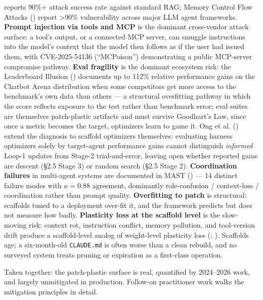 \documentclass[
]{article}
\begin{document}
reports 90\%+ attack success rate against standard RAG; Memory Control
Flow Attacks () report
\textgreater90\% vulnerability across major LLM agent frameworks.
\textbf{Prompt injection via tools and MCP} is the dominant cross-vendor
attack surface: a tool's output, or a connected MCP server, can smuggle
instructions into the model's context that the model then follows as if
the user had issued them, with CVE-2025-54136 (``MCPoison'')
demonstrating a public MCP-server compromise pathway. \textbf{Eval
fragility} is the dominant ecosystem risk: the Leaderboard Illusion
() documents up
to 112\% relative performance gains on the Chatbot Arena distribution
when some competitors get more access to the benchmark's own data than
others --- a structural overfitting pathway in which the score reflects
exposure to the test rather than benchmark error; eval suites are
themselves patch-plastic artifacts and must survive Goodhart's Law,
since once a metric becomes the target, optimizers learn to game it. Ong
et al. () extend the diagnosis to
scaffold optimizers themselves: evaluating harness optimizers solely by
target-agent performance gains cannot distinguish \emph{informed} Loop-1
updates from Stage-2 trial-and-error, leaving open whether reported
gains are descent (§2.5 Stage 3) or random search (§2.5 Stage 2).
\textbf{Coordination failures} in multi-agent systems are documented in
MAST () --- 14 distinct
failure modes with \(\kappa = 0.88\) agreement, dominantly
role-confusion / context-loss / coordination rather than prompt quality.
\textbf{Overfitting to patch} is structural: scaffolds tuned to a
deployment over-fit it, and the framework predicts but does not measure
how badly. \textbf{Plasticity loss at the scaffold level} is the
slow-moving risk: context rot, instruction conflict, memory pollution,
and tool-version drift produce a scaffold-level analog of weight-level
plasticity loss (;
). Scaffolds age;
a six-month-old \texttt{CLAUDE.md} is often worse than a clean rebuild,
and no surveyed system treats pruning or expiration as a first-class
operation.

Taken together: the patch-plastic surface is real, quantified by
2024--2026 work, and largely unmitigated in production. Follow-on
practitioner work walks the mitigation principles in detail.
\end{document}
